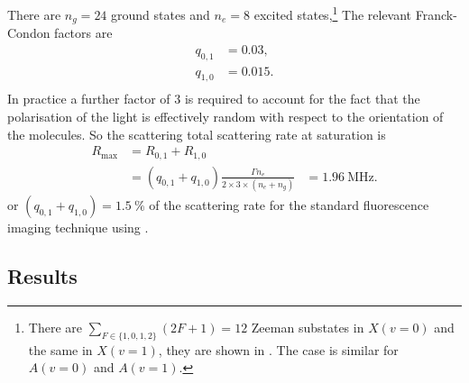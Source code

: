 There are $n_g = 24$ ground states and $n_e = 8$ excited states,\footnote{There
are $\sum_{F\in\{1,0,1,2\}}(2F+1) = 12$ Zeeman substates in $X(v=0)$ and the
same in $X(v=1)$, they are shown in . The case is similar
for $A(v=0)$ and $A(v=1)$.}
%
The relevant Franck-Condon factors are
%
\begin{align}
  q_{0,1} &= 0.03,\\
  q_{1,0} &= 0.015.\\
\end{align}
%
In practice a further factor of 3 is required to account for the fact that the
polarisation of the light is effectively random with respect to the orientation
of the molecules. So the scattering total scattering rate at saturation is
%
\begin{align}
  R_\text{max} &= R_{0,1} + R_{1,0}\\
               &= (q_{0,1} + q_{1,0})\frac{\Gamma n_e}{2\times3\times(n_e + n_g)}
               &= \SI{1.96}{\mega\hertz}.
\end{align}
%
or $(q_{0,1} + q_{1,0}) = \SI{1.5}{\percent}$ of the scattering rate for the
standard fluorescence imaging technique using .

%


\subsection{Results}

